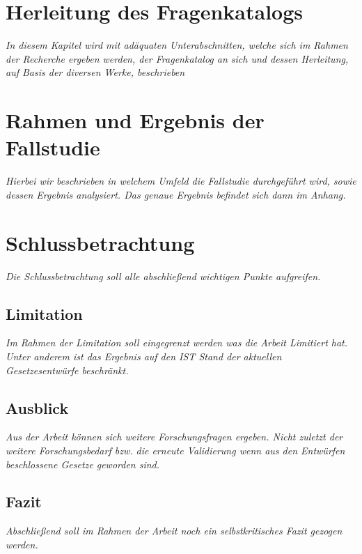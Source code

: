 \documentclass[11pt,a4paper]{article}   %
\begin{document}
    \newpage
    \section{Herleitung des Fragenkatalogs}
        \emph{In diesem Kapitel wird mit adäquaten Unterabschnitten, welche sich im Rahmen der Recherche ergeben werden, der Fragenkatalog an sich und dessen Herleitung, auf Basis der diversen Werke, beschrieben}

    \newpage
    \section{Rahmen und Ergebnis der Fallstudie}
        \emph{Hierbei wir beschrieben in welchem Umfeld die Fallstudie durchgeführt wird, sowie dessen Ergebnis analysiert. Das genaue Ergebnis befindet sich dann im Anhang.}

    \newpage
    \section{Schlussbetrachtung}
        \emph{Die Schlussbetrachtung soll alle abschließend wichtigen Punkte aufgreifen.}
        \subsection{Limitation}
        \emph{Im Rahmen der Limitation soll eingegrenzt werden was die Arbeit Limitiert hat. Unter anderem ist das Ergebnis auf den IST Stand der aktuellen Gesetzesentwürfe beschränkt.}
        \subsection{Ausblick}
        \emph{Aus der Arbeit können sich weitere Forschungsfragen ergeben. Nicht zuletzt der weitere Forschungsbedarf bzw. die erneute Validierung wenn aus den Entwürfen beschlossene Gesetze geworden sind.}
        \subsection{Fazit}
        \emph{Abschließend soll im Rahmen der Arbeit noch ein selbstkritisches Fazit gezogen werden.}

    \newpage
    \nocite{*}
    \printbibliography
\end{document}
